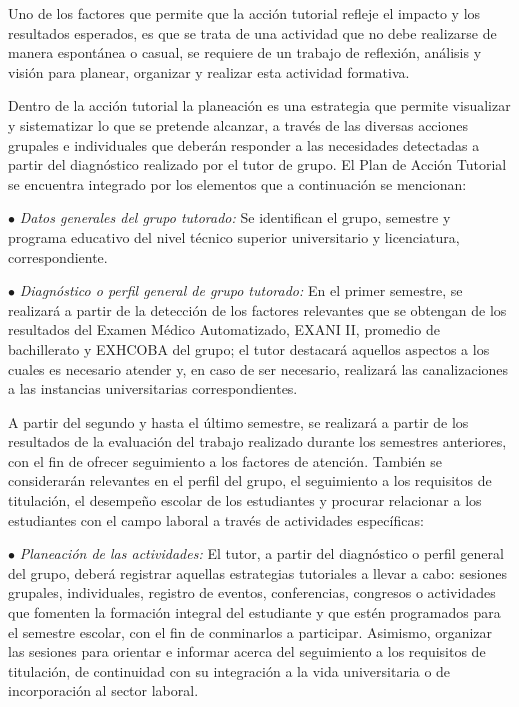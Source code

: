 Uno de los factores que permite que la acción tutorial refleje el impacto y
los resultados esperados, es que se trata de una actividad que no debe
realizarse de manera espontánea o casual, se requiere de un trabajo de
reflexión, análisis y visión para planear, organizar y realizar esta
actividad formativa.

\enlargethispage{1\baselineskip}
Dentro de la acción tutorial la planeación es una estrategia que permite
visualizar y sistematizar lo que se pretende alcanzar, a través de las
diversas acciones grupales e individuales que deberán responder a las
necesidades detectadas a partir del diagnóstico realizado por el tutor de
grupo. El Plan de Acción Tutorial se encuentra integrado por los elementos
que a continuación se mencionan:

\begin{Obs}
\item[$\bullet$] {\slshape Datos generales del grupo tutorado:} Se identifican el grupo,
semestre y programa educativo del nivel técnico superior universitario y
licenciatura, correspondiente.
\item[$\bullet$] {\slshape Diagnóstico o perfil general de grupo tutorado:} En el primer
semestre, se realizará a partir de la detección de los factores relevantes
que se obtengan de los resultados del Examen Médico Automatizado, EXANI II,
promedio de bachillerato y EXHCOBA del grupo; el tutor destacará aquellos
aspectos a los cuales es necesario atender y, en caso de ser necesario,
realizará las canalizaciones a las instancias universitarias
correspondientes.

A partir del segundo y hasta el último semestre, se realizará a partir de
los resultados de la evaluación del trabajo realizado durante los semestres
anteriores, con el fin de ofrecer seguimiento a los factores de atención.
También se considerarán relevantes en el perfil del grupo, el seguimiento a
los requisitos de titulación, el desempeño escolar de los estudiantes y
procurar relacionar a los estudiantes con el campo laboral a través de
actividades específicas:
\item[$\bullet$] {\slshape Planeación de las actividades:} El tutor, a partir del
diagnóstico o perfil general del grupo, deberá registrar aquellas
estrategias tutoriales a llevar a cabo: sesiones grupales, individuales,
registro de eventos, conferencias, congresos o actividades que fomenten la
formación integral del estudiante y que estén programados para el semestre
escolar, con el fin de conminarlos a participar. Asimismo, organizar las
sesiones para orientar e informar acerca del seguimiento a los requisitos
de titulación, de continuidad con su integración a la vida universitaria o
de incorporación al sector laboral.
\end{Obs}

